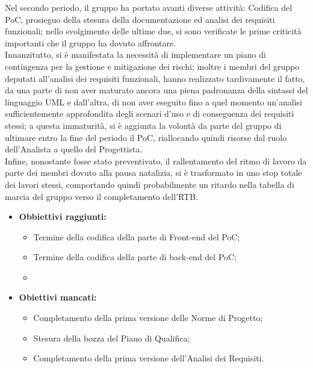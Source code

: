Nel secondo periodo, il gruppo ha portato avanti diverse attività: Codifica del PoC, prosieguo della stesura della documentazione ed analisi dei requisiti funzionali; nello svolgimento delle ultime due, si sono verificate
le prime criticità importanti che il gruppo ha dovuto affrontare.\\
Innanzitutto, si è manifestata la necessità di implementare un piano di contingenza per la gestione e mitigazione dei rischi; inoltre i membri del gruppo deputati
all'analisi dei requisiti funzionali, hanno realizzato tardivamente il fatto, da una parte di non aver maturato ancora una piena padronanza della sintassi del linguaggio UML e dall'altra, di non aver eseguito fino a quel
momento un'analisi sufficientemente approfondita degli scenari d'uso e di conseguenza dei requisiti stessi; a questa immaturità, si è aggiunta la volontà da parte del gruppo di ultimare
entro la fine del periodo il PoC, riallocando quindi risorse dal ruolo dell'Analista a quello del Progettista. \\
Infine, nonostante fosse stato preventivato, il rallentamento del ritmo di lavoro da parte dei membri
dovuto alla pausa natalizia, si è trasformato in uno stop totale dei lavori stessi, comportando quindi probabilmente un ritardo nella tabella di marcia del gruppo verso il completamento dell'RTB.
\begin{itemize}
\item \textbf{Obbiettivi raggiunti:}
    \begin{itemize}
        \item Termine della codifica della parte di Front-end del PoC;
        \item Termine della codifica della parte di back-end del PoC;
        \item
    \end{itemize}
    \item \textbf{Obiettivi mancati:}
    \begin{itemize}
        \item Completamento della prima versione delle Norme di Progetto;
        \item Stesura della bozza del Piano di Qualifica;
        \item Completamento della prima versione dell'Analisi dei Requisiti.
    \end{itemize}
\end{itemize}
